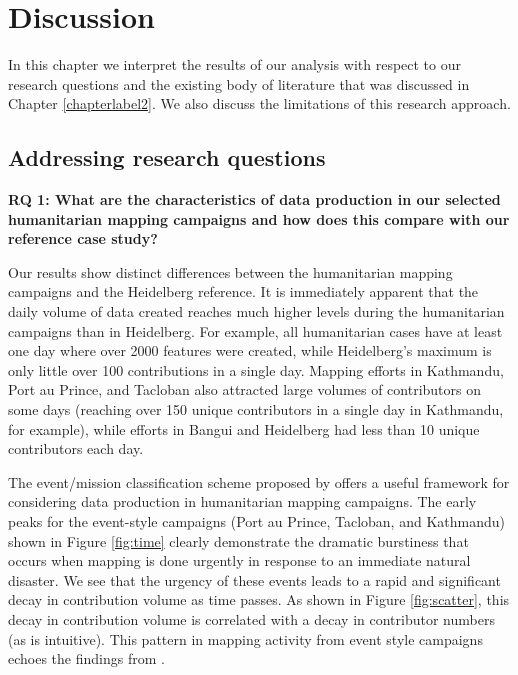 \chapter{Discussion}
\label{chapterlabel6}

In this chapter we interpret the results of our analysis with respect to our research questions and the existing body of literature that was discussed in Chapter \ref{chapterlabel2}. We also discuss the limitations of this research approach. 

\section{Addressing research questions}

\noindent\textbf{RQ 1: What are the characteristics of data production in our selected humanitarian mapping campaigns and how does this compare with our reference case study?} 

Our results show distinct differences between the humanitarian mapping campaigns and the Heidelberg reference. It is immediately apparent that the daily volume of data created reaches much higher levels during the humanitarian campaigns than in Heidelberg. For example, all humanitarian cases have at least one day where over 2000 features were created, while Heidelberg's maximum is only little over 100 contributions in a single day. Mapping efforts in Kathmandu, Port au Prince, and Tacloban also attracted large volumes of contributors on some days (reaching over 150 unique contributors in a single day in Kathmandu, for example), while efforts in Bangui and Heidelberg had less than 10 unique contributors each day. 

The event/mission classification scheme proposed by \textcite{dittus_mass_2017} offers a useful framework for considering data production in humanitarian mapping campaigns. The early peaks for the event-style campaigns (Port au Prince, Tacloban, and Kathmandu) shown in Figure \ref{fig:time} clearly demonstrate the dramatic burstiness that occurs when mapping is done urgently in response to an immediate natural disaster. We see that the urgency of these events leads to a rapid and significant decay in contribution volume as time passes. As shown in Figure \ref{fig:scatter}, this decay in contribution volume is correlated with a decay in contributor numbers (as is intuitive). This pattern in mapping activity from event style campaigns echoes the findings from \textcite[p. 1294]{dittus_mass_2017}.

